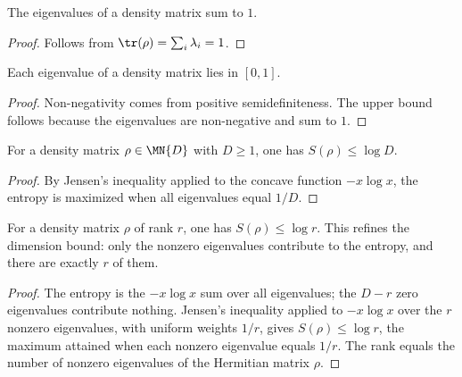 \begin{lemma}\label{lem:density_eigenvalues_sum}
    \leanok
    The eigenvalues of a density matrix sum to $1$.
\end{lemma}

\begin{proof}\leanok
    Follows from $\tr(\rho)=\sum_i\lambda_i=1$.
\end{proof}

\begin{theorem}\label{thm:density_eigenvalues_le_one}
    \leanok
    Each eigenvalue of a density matrix lies in $[0,1]$.
\end{theorem}

\begin{proof}\leanok
    Non-negativity comes from positive semidefiniteness. The upper bound
    follows because the eigenvalues are non-negative and sum to $1$.
\end{proof}

\begin{theorem}\label{thm:entropy_le_log_dim}
    \leanok
    For a density matrix $\rho\in\MN{D}$ with $D\ge1$, one has
    $S(\rho)\le\log D$.
\end{theorem}

\begin{proof}\leanok
    By Jensen's inequality applied to the concave function $-x\log x$,
    the entropy is maximized when all eigenvalues equal $1/D$.
\end{proof}

\begin{theorem}\label{thm:entropy_le_log_rank}
    \leanok
    For a density matrix $\rho$ of rank $r$, one has $S(\rho)\le\log r$.
    This refines the dimension bound: only the nonzero eigenvalues contribute to
    the entropy, and there are exactly $r$ of them.
\end{theorem}

\begin{proof}\leanok
    The entropy is the $-x\log x$ sum over all eigenvalues; the $D-r$ zero
    eigenvalues contribute nothing. Jensen's inequality applied to $-x\log x$
    over the $r$ nonzero eigenvalues, with uniform weights $1/r$, gives
    $S(\rho)\le\log r$, the maximum attained when each nonzero eigenvalue
    equals $1/r$. The rank equals the number of nonzero eigenvalues of the
    Hermitian matrix $\rho$.
\end{proof}

